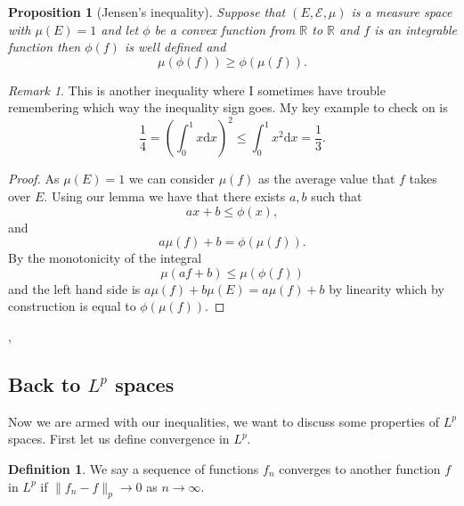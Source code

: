 \documentclass[11pt]{article}
\newtheorem{prp}[thm]{Proposition}
\theoremstyle{definition}
\newtheorem{dfn}[thm]{Definition}
\theoremstyle{remark}
\newtheorem{remark}[thm]{Remark}
\begin{document}
\begin{prp}[Jensen's inequality]
Suppose that $(E, \mathcal{E}, \mu)$ is a measure space with $\mu(E) = 1$ and let $\phi$ be a convex function from $\mathbb{R}$ to $\mathbb{R}$ and $f$ is an integrable function then $\phi(f)$ is well defined and 
\[ \mu(\phi(f)) \geq \phi(\mu(f)). \] 
\end{prp}
\begin{remark}
This is another inequality where I sometimes have trouble remembering which way the inequality sign goes. My key example to check on is \[ \frac{1}{4} = \left( \int_0^1 x \mathrm{d}x \right)^2 \leq \int_0^1 x^2 \mathrm{d}x = \frac{1}{3}. \]
\end{remark}
\begin{proof}
As $\mu(E)=1$ we can consider $\mu(f)$ as the average value that $f$ takes over $E$. Using our lemma we have that there exists $a,b$ such that
\[ ax+b \leq \phi(x), \] and \[a\mu(f)+b = \phi(\mu(f)).\] By the monotonicity of the integral
\[ \mu(af + b) \leq \mu(\phi(f)) \] and the left hand side is $a \mu(f) +b \mu(E)= a \mu(f) +b$ by linearity which by construction is equal to $\phi(\mu(f))$.
\end{proof},

\subsection{Back to $L^p$ spaces}
 Now we are armed with our inequalities, we want to discuss some properties of $L^p$ spaces. First let us define convergence in $L^p$.
\begin{dfn}
We say a sequence of functions $f_n$ converges to another function $f$ in $L^p$ if $\|f_n -f\|_p \rightarrow 0$ as $n \rightarrow \infty$.
\end{dfn}
\end{document}
